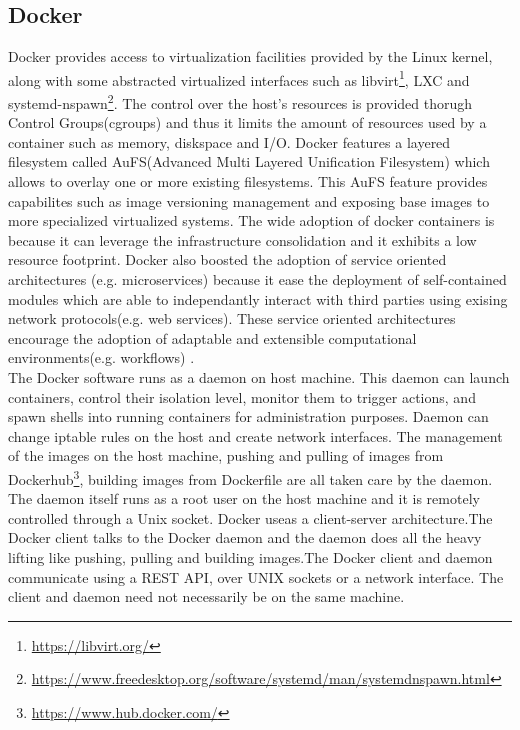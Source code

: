\subsection{Docker}
Docker provides access to virtualization facilities provided by the Linux kernel, along with some abstracted virtualized interfaces such as libvirt\footnote{\url{https://libvirt.org/}}, LXC and systemd-nspawn\footnote{\url{https://www.freedesktop.org/software/systemd/man/systemdnspawn.html}}. The control over the host's resources is provided thorugh Control Groups(cgroups) and thus it limits the amount of resources used by a container such as memory, diskspace and I/O. Docker features a layered filesystem called AuFS(Advanced Multi Layered Unification Filesystem) which allows to overlay one or more existing filesystems. This AuFS feature provides capabilites such as image versioning management and exposing base images to more specialized virtualized systems. The wide adoption of docker containers is because it can leverage the infrastructure consolidation and it exhibits a low resource footprint. Docker also boosted the adoption of service oriented architectures (e.g. microservices) because it ease the deployment of self-contained modules which are able to independantly interact with third parties using exising network protocols(e.g. web services). These service oriented architectures encourage the adoption of adaptable and extensible computational environments(e.g. workflows) \cite{Xavier:2013:PEC:2497369.2497577}. \\

The Docker software runs as a daemon on host machine. This daemon can launch containers, control their isolation level, monitor them to trigger actions, and spawn shells into running containers for administration purposes. Daemon can change iptable rules on the host and create network interfaces. The management of the images on the host machine, pushing and pulling of images from Dockerhub\footnote{\url{https://www.hub.docker.com/}}, building images from Dockerfile are all taken care by the daemon. The daemon itself runs as a root user on the host machine and it is remotely controlled through a Unix socket. Docker useas a client-server architecture.The Docker client talks to the Docker daemon and the daemon does all the heavy lifting like pushing, pulling and building images.The Docker client and daemon communicate using a REST API, over UNIX sockets or a network interface. The client and daemon need not necessarily be on the same machine\cite{docker-documentation}.

